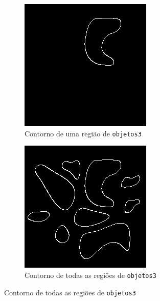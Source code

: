 \documentclass[brazilian,a4paper,twocolumn]{article}
\begin{document}
\begin{figure}[H]
            \begin{subfigure}{0.23\textwidth}
                \includegraphics[width=\textwidth,keepaspectratio]{contornos/objetos3-region-2-contornos}
                \caption{Contorno de uma região de \texttt{objetos3}}
                \label{fig:objetos3-contorno-isolado}
            \end{subfigure}
            \hfill
            \begin{subfigure}{0.23\textwidth}
                \includegraphics[width=\textwidth,keepaspectratio]{objetos3-contorno}
                \caption{Contorno de todas as regiões de \texttt{objetos3}}
                \label{fig:objetos3-contornos}
            \end{subfigure}


\end{figure}
\end{document}
